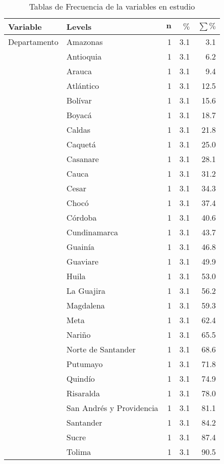 \documentclass{article}
\begin{document}
\begingroup\normalsize
\begin{longtable}{llrrr}
\caption{Tablas de Frecuencia de la variables en estudio} \\ 
 \textbf{Variable} & \textbf{Levels} & $\mathbf{n}$ & $\mathbf{\%}$ & $\mathbf{\sum \%}$ \\ 
  \hline \hline
Departamento & Amazonas & 1 & 3.1 & 3.1 \\ 
   & Antioquia & 1 & 3.1 & 6.2 \\ 
   & Arauca & 1 & 3.1 & 9.4 \\ 
   & Atlántico & 1 & 3.1 & 12.5 \\ 
   & Bolívar & 1 & 3.1 & 15.6 \\ 
   & Boyacá & 1 & 3.1 & 18.7 \\ 
   & Caldas & 1 & 3.1 & 21.8 \\ 
   & Caquetá & 1 & 3.1 & 25.0 \\ 
   & Casanare & 1 & 3.1 & 28.1 \\ 
   & Cauca & 1 & 3.1 & 31.2 \\ 
   & Cesar & 1 & 3.1 & 34.3 \\ 
   & Chocó & 1 & 3.1 & 37.4 \\ 
   & Córdoba & 1 & 3.1 & 40.6 \\ 
   & Cundinamarca & 1 & 3.1 & 43.7 \\ 
   & Guainía & 1 & 3.1 & 46.8 \\ 
   & Guaviare & 1 & 3.1 & 49.9 \\ 
   & Huila & 1 & 3.1 & 53.0 \\ 
   & La Guajira & 1 & 3.1 & 56.2 \\ 
   & Magdalena & 1 & 3.1 & 59.3 \\ 
   & Meta & 1 & 3.1 & 62.4 \\ 
   & Nariño & 1 & 3.1 & 65.5 \\ 
   & Norte de Santander & 1 & 3.1 & 68.6 \\ 
   & Putumayo & 1 & 3.1 & 71.8 \\ 
   & Quindío & 1 & 3.1 & 74.9 \\ 
   & Risaralda & 1 & 3.1 & 78.0 \\ 
   & San Andrés y Providencia & 1 & 3.1 & 81.1 \\ 
   & Santander & 1 & 3.1 & 84.2 \\ 
   & Sucre & 1 & 3.1 & 87.4 \\ 
   & Tolima & 1 & 3.1 & 90.5 \\ 

\end{longtable}
\end{document}
